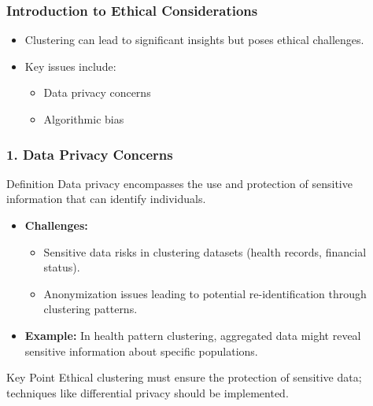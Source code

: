 \documentclass[aspectratio=169]{beamer}
\begin{document}
\begin{frame}[fragile]
    \frametitle{Introduction to Ethical Considerations}
    \begin{itemize}
        \item Clustering can lead to significant insights but poses ethical challenges.
        \item Key issues include:
        \begin{itemize}
            \item Data privacy concerns
            \item Algorithmic bias
        \end{itemize}
    \end{itemize}
\end{frame}

\begin{frame}[fragile]
    \frametitle{1. Data Privacy Concerns}
    \begin{block}{Definition}
        Data privacy encompasses the use and protection of sensitive information that can identify individuals.
    \end{block}
    \begin{itemize}
        \item \textbf{Challenges:}
        \begin{itemize}
            \item Sensitive data risks in clustering datasets (health records, financial status).
            \item Anonymization issues leading to potential re-identification through clustering patterns.
        \end{itemize}
        \item \textbf{Example:}
        In health pattern clustering, aggregated data might reveal sensitive information about specific populations.
    \end{itemize}
    \begin{block}{Key Point}
        Ethical clustering must ensure the protection of sensitive data; techniques like differential privacy should be implemented.
    \end{block}
\end{frame}
\end{document}
